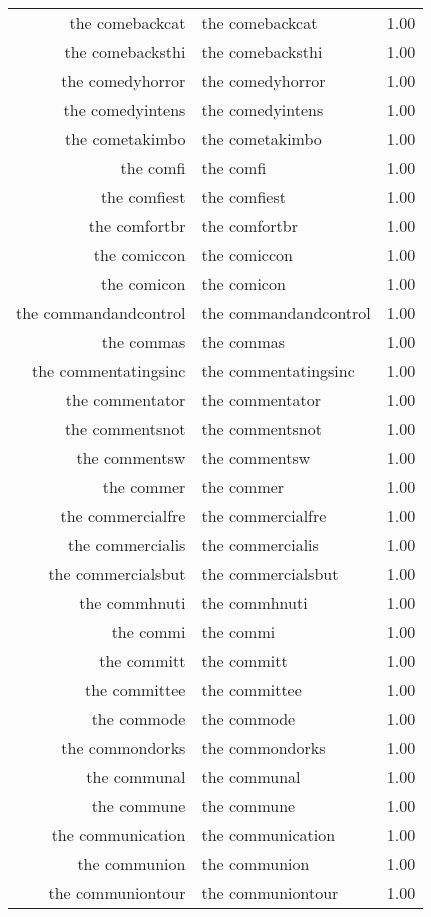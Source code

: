 \begin{table}[ht]
\begin{tabular}{rlr}
  the comebackcat & the comebackcat & 1.00 \\ 
  the comebacksthi & the comebacksthi & 1.00 \\ 
  the comedyhorror & the comedyhorror & 1.00 \\ 
  the comedyintens & the comedyintens & 1.00 \\ 
  the cometakimbo & the cometakimbo & 1.00 \\ 
  the comfi & the comfi & 1.00 \\ 
  the comfiest & the comfiest & 1.00 \\ 
  the comfortbr & the comfortbr & 1.00 \\ 
  the comiccon & the comiccon & 1.00 \\ 
  the comicon & the comicon & 1.00 \\ 
  the commandandcontrol & the commandandcontrol & 1.00 \\ 
  the commas & the commas & 1.00 \\ 
  the commentatingsinc & the commentatingsinc & 1.00 \\ 
  the commentator & the commentator & 1.00 \\ 
  the commentsnot & the commentsnot & 1.00 \\ 
  the commentsw & the commentsw & 1.00 \\ 
  the commer & the commer & 1.00 \\ 
  the commercialfre & the commercialfre & 1.00 \\ 
  the commercialis & the commercialis & 1.00 \\ 
  the commercialsbut & the commercialsbut & 1.00 \\ 
  the commhnuti & the commhnuti & 1.00 \\ 
  the commi & the commi & 1.00 \\ 
  the committ & the committ & 1.00 \\ 
  the committee & the committee & 1.00 \\ 
  the commode & the commode & 1.00 \\ 
  the commondorks & the commondorks & 1.00 \\ 
  the communal & the communal & 1.00 \\ 
  the commune & the commune & 1.00 \\ 
  the communication & the communication & 1.00 \\ 
  the communion & the communion & 1.00 \\ 
  the communiontour & the communiontour & 1.00 \\ 

\end{tabular}
\end{table}
